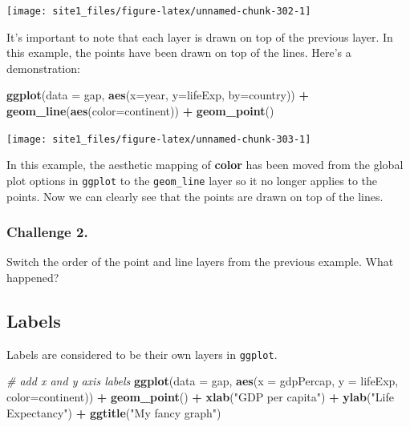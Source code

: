 \documentclass[]{book}
\newenvironment{Shaded}{\begin{snugshade}}{\end{snugshade}}
\newcommand{\KeywordTok}[1]{\textcolor[rgb]{0.13,0.29,0.53}{\textbf{#1}}}
\newcommand{\DataTypeTok}[1]{\textcolor[rgb]{0.13,0.29,0.53}{#1}}
\newcommand{\StringTok}[1]{\textcolor[rgb]{0.31,0.60,0.02}{#1}}
\newcommand{\CommentTok}[1]{\textcolor[rgb]{0.56,0.35,0.01}{\textit{#1}}}
\newcommand{\OperatorTok}[1]{\textcolor[rgb]{0.81,0.36,0.00}{\textbf{#1}}}
\newcommand{\NormalTok}[1]{#1}
\begin{document}
\begin{center}\texttt{[image: site1\_files/figure-latex/unnamed-chunk-302-1]} \end{center}

It's important to note that each layer is drawn on top of the previous
layer. In this example, the points have been drawn on top of the lines.
Here's a demonstration:

\begin{Shaded}
\begin{Highlighting}[]
\KeywordTok{ggplot}\NormalTok{(}\DataTypeTok{data =}\NormalTok{ gap, }\KeywordTok{aes}\NormalTok{(}\DataTypeTok{x=}\NormalTok{year, }\DataTypeTok{y=}\NormalTok{lifeExp, }\DataTypeTok{by=}\NormalTok{country)) }\OperatorTok{+}\StringTok{ }
\StringTok{  }\KeywordTok{geom_line}\NormalTok{(}\KeywordTok{aes}\NormalTok{(}\DataTypeTok{color=}\NormalTok{continent)) }\OperatorTok{+}\StringTok{ }
\StringTok{  }\KeywordTok{geom_point}\NormalTok{()}
\end{Highlighting}
\end{Shaded}

\begin{center}\texttt{[image: site1\_files/figure-latex/unnamed-chunk-303-1]} \end{center}

In this example, the aesthetic mapping of \textbf{color} has been moved
from the global plot options in \texttt{ggplot} to the
\texttt{geom\_line} layer so it no longer applies to the points. Now we
can clearly see that the points are drawn on top of the lines.

\subsubsection*{Challenge 2.}\label{challenge-2.-8}

Switch the order of the point and line layers from the previous example.
What happened?

\subsection{Labels}\label{labels-1}

Labels are considered to be their own layers in \texttt{ggplot}.

\begin{Shaded}
\begin{Highlighting}[]
\CommentTok{# add x and y axis labels}
\KeywordTok{ggplot}\NormalTok{(}\DataTypeTok{data =}\NormalTok{ gap, }\KeywordTok{aes}\NormalTok{(}\DataTypeTok{x =}\NormalTok{ gdpPercap, }\DataTypeTok{y =}\NormalTok{ lifeExp, }\DataTypeTok{color=}\NormalTok{continent)) }\OperatorTok{+}\StringTok{ }
\StringTok{  }\KeywordTok{geom_point}\NormalTok{() }\OperatorTok{+}\StringTok{ }
\StringTok{  }\KeywordTok{xlab}\NormalTok{(}\StringTok{"GDP per capita"}\NormalTok{) }\OperatorTok{+}\StringTok{ }
\StringTok{  }\KeywordTok{ylab}\NormalTok{(}\StringTok{"Life Expectancy"}\NormalTok{) }\OperatorTok{+}\StringTok{ }
\StringTok{  }\KeywordTok{ggtitle}\NormalTok{(}\StringTok{"My fancy graph"}\NormalTok{)}
\end{Highlighting}
\end{Shaded}
\end{document}
